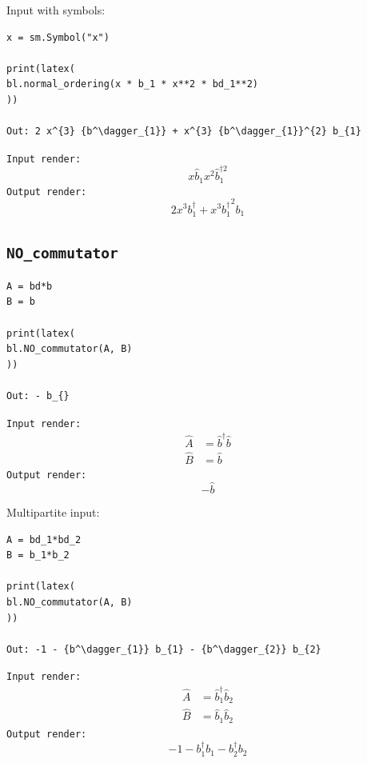 \documentclass[onecolumn, 12pt, sort&compress]{elsarticle}
\newcommand{\inlinecode}[1]{\texttt{#1}}
\newcommand{\bop}{\hat{b}}
\newcommand{\bdag}{\bop^\dagger}
\newcommand{\bdagn}[1]{\bop^{\dagger {#1}}}
\newenvironment{revision2}{%
\color{red}
}
{}
\begin{document}
\noindent Input with symbols:
\begin{verbatim}
x = sm.Symbol("x")

print(latex(
bl.normal_ordering(x * b_1 * x**2 * bd_1**2)
))

Out: 2 x^{3} {b^\dagger_{1}} + x^{3} {b^\dagger_{1}}^{2} b_{1}
\end{verbatim}
\begin{revision2}
\inlinecode{Input render:}
\begin{equation*}
    x\bop_1 x^2 \bdagn{2}_1
\end{equation*}
\inlinecode{Output render:}
\begin{equation*}
    2 x^{3} {b^\dagger_{1}} + x^{3} {b^\dagger_{1}}^{2} b_{1}
\end{equation*}
\end{revision2}


\subsection{\inlinecode{NO_commutator}}

\begin{verbatim}
A = bd*b
B = b

print(latex(
bl.NO_commutator(A, B)
))

Out: - b_{}     
\end{verbatim}
\begin{revision2}
\inlinecode{Input render:}
\begin{align*}
    \hat{A} &= \bdag\bop
    \\
    \hat{B} &= \bop
\end{align*}
\inlinecode{Output render:}
\begin{equation*}
    -\bop
\end{equation*}
\end{revision2}

\noindent Multipartite input:
\begin{verbatim}
A = bd_1*bd_2
B = b_1*b_2

print(latex(
bl.NO_commutator(A, B)
))

Out: -1 - {b^\dagger_{1}} b_{1} - {b^\dagger_{2}} b_{2}
\end{verbatim}
\begin{revision2}
\inlinecode{Input render:}
\begin{align*}
    \hat{A} &= \bdag_1\bop_2
    \\
    \hat{B} &= \bop_1\bop_2
\end{align*}
\inlinecode{Output render:}
\begin{equation*}
    -1 - {b^\dagger_{1}} b_{1} - {b^\dagger_{2}} b_{2}
\end{equation*}
\end{revision2}
\end{document}
